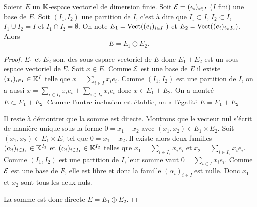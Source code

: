 \begin{theo}\label{theo:theosuppdimfinie}
  Soient \(E\) un \(\mathbb{K}\)-espace vectoriel de dimension finie. Soit \(\mathcal{E}=(e_i)_{i \in I}\) (\(I\) fini) une base de \(E\). Soit \((I_1, I_2)\) une partition de \(I\), c'est à dire que \(I_1 \subset I\), \(I_2 \subset I\), \(I_1 \cup I_2 =I\) et \(I_1 \cap I_2 = \emptyset\). On note \(E_1 = \operatorname{Vect}((e_i)_{i \in I_1})\) et \(E_2 = \operatorname{Vect}((e_i)_{i \in I_2})\). Alors
  \begin{equation}
    E = E_1 \oplus E_2.
  \end{equation}
\end{theo}
\begin{proof}
  \(E_1\) et \(E_2\) sont des sous-espace vectoriel de \(E\) donc \(E_1+E_2\) est un sous-espace vectoriel de \(E\). Soit \(x \in E\). Comme \(\mathcal{E}\) est une base de \(E\) il existe \((x_i)_{i \in I} \in \mathbb{K}^I\) telle que \(x= \sum_{i \in I} x_i e_i\). Comme \((I_1,I_2)\) est une partition de \(I\), on a aussi \(x = \sum_{i \in I_1} x_i e_i + \sum_{i \in I_2} x_i e_i\) donc \(x \in E_1+E_2\). On a montré \(E \subset E_1+E_2\). Comme l'autre inclusion est établie, on a l'égalité \(E=E_1+E_2\).

Il reste à démontrer que la somme est directe. Montrons que le vecteur nul s'écrit de manière unique sous la forme \(0=x_1+x_2\) avec \((x_1,x_2) \in E_1 \times E_2\). Soit \((x_1,x_2) \in E_1 \times E_2\) tel que \(0=x_1+x_2\). Il existe alors deux familles \((\alpha_i)_{i \in I_1} \in \mathbb{K}^{I_1}\) et \((\alpha_i)_{i \in I_1} \in \mathbb{K}^{I_2}\) telles que \(x_1 = \sum_{i \in I_1} x_i e_i\) et  \(x_2 = \sum_{i \in I_2} x_i e_i\). Comme \((I_1,I_2)\) est une partition de \(I\), leur somme vaut \(0 = \sum_{i \in I} x_i e_i\). Comme \(\mathcal{E}\) est une base de \(E\), elle est libre et donc la famille \((\alpha_i)_{i \in I}\) est nulle. Donc \(x_1\) et \(x_2\) sont tous les deux nuls.

La somme est donc directe \(E = E_1 \oplus E_2\).
\end{proof}

